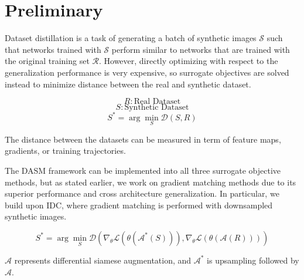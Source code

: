 \documentclass{article}
\theoremstyle{plain}
\theoremstyle{definition}
\theoremstyle{remark}
\begin{document}
\section{Preliminary}

Dataset distillation is a task of generating a batch of synthetic images $\mathcal{S}$ such that networks trained with $\mathcal{S}$ perform similar to networks that are trained with the original training set $\mathcal{R}$. However, directly optimizing with respect to the generalization performance is very expensive, so surrogate objectives are solved instead to minimize distance between the real and synthetic dataset.

\begin{equation}
R: \text{Real Dataset}
\end{equation}
\begin{equation}
S: \text{Synthetic Dataset}
\end{equation}
\begin{equation}
S^* = \arg \min_{S} \mathcal{D}(S,R)
\end{equation}

The distance between the datasets can be measured in term of feature maps, gradients, or training trajectories. 

The  DASM framework can be implemented into all three surrogate objective methods, but as stated earlier, we work on gradient matching methods due to its superior performance and cross architecture generalization. In particular, we build upon IDC, where gradient matching is performed with downsampled synthetic images.

\begin{equation}
S^* = \arg \min_{S} \mathcal{D} \left( \nabla_{\theta} \mathcal{L}(\theta(\mathcal{A}^*(S))), \nabla_{\theta} \mathcal{L}(\theta(\mathcal{A}(R))) \right)
\end{equation}

$\mathcal{A}$ represents differential siamese augmentation, and $\mathcal{A}^*$ is upsampling followed by $\mathcal{A}$.






\nocite{langley00}





\newpage
\appendix
\onecolumn
\end{document}
